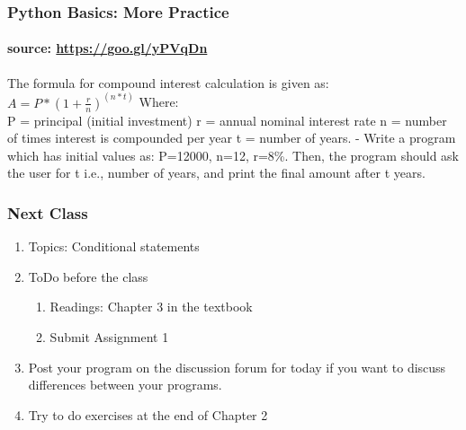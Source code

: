 \documentclass{beamer}
\begin{document}
\begin{frame}
\frametitle{Python Basics: More Practice}
\framesubtitle{source: \url{https://goo.gl/yPVqDn}}
The formula for compound interest calculation is given as:
$A = P * (1 + \frac{r}{n})^(n*t)$
Where: \\
P = principal (initial investment)
r = annual nominal interest rate
n = number of times interest is compounded per year
t = number of years. 
- Write a program which has initial values as: P=12000, n=12, r=8\%. Then, the program should ask the user for t i.e., number of years, and print the final amount after t years. 
\end{frame}

\begin{frame}
\frametitle{Next Class}
\begin{enumerate}
\item Topics: Conditional statements
\item ToDo before the class
\begin{enumerate}
\item Readings: Chapter 3 in the textbook
\item Submit Assignment 1
\end{enumerate}
\item Post your program on the discussion forum for today if you want to discuss differences between your programs. 
\item Try to do exercises at the end of Chapter 2
\end{enumerate}
\end{frame}
\end{document}
